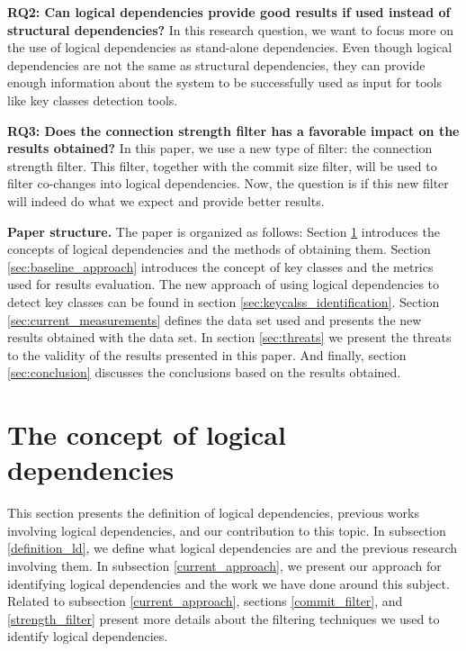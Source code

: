 \documentclass[runningheads]{comsis2}
\begin{document}
\textbf{RQ2: Can logical dependencies provide good results if used instead of structural dependencies?}
In this research question, we want to focus more on the use of logical dependencies as stand-alone dependencies. Even though logical dependencies are not the same as structural dependencies, they can provide enough information about the system to be successfully used as input for tools like key classes detection tools. 

\textbf{RQ3: Does the connection strength filter has a favorable impact on the results obtained?}
In this paper, we use a new type of filter: the connection strength filter. This filter, together with the commit size filter, will be used to filter co-changes into logical dependencies. Now, the question is if this new filter will indeed do what we expect and provide better results.

\textbf{Paper structure.} The paper is organized as follows: Section \ref{ld_def} introduces the concepts of logical dependencies and the methods of obtaining them. Section \ref{sec:baseline_approach} introduces the concept of key classes and the metrics used for results evaluation. The new approach of using logical dependencies to detect key classes can be found in section \ref{sec:keycalss_identification}. Section \ref{sec:current_measurements} defines the data set used and presents the new results obtained with the data set. In section \ref{sec:threats} we present the threats to the validity of the results presented in this paper. And finally, section \ref{sec:conclusion} discusses the conclusions based on the results obtained. 




\section{The concept of logical dependencies}
\label{ld_def}
This section presents the definition of logical dependencies, previous works involving logical dependencies, and our contribution to this topic. In subsection \ref{definition_ld}, we define what logical dependencies are and the previous research involving them. In subsection \ref{current_approach}, we present our approach for identifying logical dependencies and the work we have done around this subject. Related to subsection \ref{current_approach}, sections \ref{commit_filter}, and \ref{strength_filter} present more details about the filtering techniques we used to identify logical dependencies.
\end{document}
